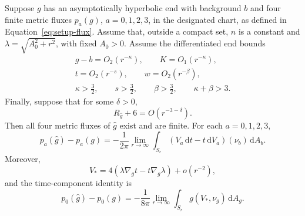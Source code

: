 \begin{proposition}
\label{prop:ah-alg-mass-passage}
Suppose \(g\) has an asymptotically hyperbolic end with background \(b\)
and four finite metric fluxes \(p_a(g)\), \(a=0,1,2,3\), in the
designated chart, as defined in Equation~\eqref{eq:setup-flux}.
Assume that, outside a compact set, \(n\) is a
constant and
\(\lambda=\sqrt{A_0^2+r^2}\), with fixed \(A_0>0\).  Assume the
differentiated end bounds
\begin{equation}
 \begin{gathered}
 g-b=O_2(r^{-\kappa}),\qquad K=O_1(r^{-\kappa}),\\
 t=O_2(r^{-s}),\qquad w=O_2(r^{-\beta}),\\
 \kappa>\frac32,\qquad s>\frac32,\qquad\beta>\frac32,\qquad
 \kappa+\beta>3 .
 \end{gathered}
 \label{eq:ah-alg-end-W}
\end{equation}
Finally, suppose that for some \(\delta>0\),
\begin{equation}
 R_{\widehat g}+6=O(r^{-3-\delta}).
 \label{eq:ah-alg-end-R}
\end{equation}
Then all four metric fluxes of \(\widehat g\) exist and are finite.
For each \(a=0,1,2,3\),
\begin{equation}
 p_a(\widehat g)-p_a(g)
   =-\frac1{2\pi}
       \lim_{r\to\infty}
       \int_{S_r}(V_a\,\mathrm dt-t\,\mathrm dV_a)(\nu_b)
                         \,\mathrm dA_b .
 \label{eq:ah-alg-four-flux}
\end{equation}
Moreover,
\begin{equation}
 V_*=4(\lambda\nabla_gt-t\nabla_g\lambda)+o(r^{-2}),
 \label{eq:ah-alg-Vstar-asymptote}
\end{equation}
and the time-component identity is
\begin{equation}
 p_0(\widehat g)-p_0(g)
   =-\frac1{8\pi}\lim_{r\to\infty}
        \int_{S_r}g(V_*,\nu_g)\,\mathrm dA_g .
 \label{eq:ah-alg-time-flux}
\end{equation}
\end{proposition}

